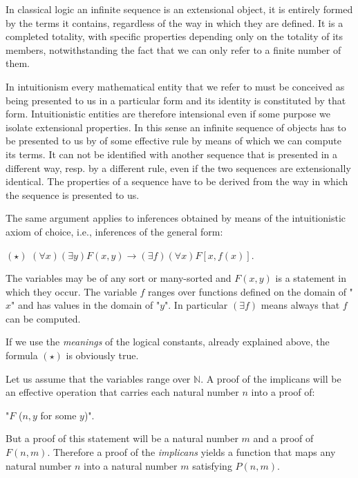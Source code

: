 \documentclass[12pt]{article}
\begin{document}
In classical logic an infinite sequence is an extensional object, it is entirely formed by the terms it contains, regardless of the way in which they are defined. It is a completed totality, with specific properties depending only on the totality of its members, notwithstanding the fact that we can only refer to a finite number of them. 

In intuitionism every mathematical entity that we refer to must be conceived as being presented to us in a particular form and its identity is constituted by that form. Intuitionistic entities are therefore intensional even if  some purpose we isolate extensional properties. In this sense an infinite sequence of objects has to be presented to us  by  of  some effective rule by means of which we can compute its terms. It can not be identified with another sequence that is presented in a different way, resp. by a different rule, even if the two sequences are extensionally identical. The properties of a sequence have to be derived from the way in which the sequence is presented to us.
 
The same argument applies to inferences obtained by means of the intuitionistic axiom of choice, i.e., inferences of the general form:
                 
\begin{center}
$(\star)$ \qquad \qquad $(\forall x) (\exists y) F (x, y) \rightarrow (\exists f) (\forall x) F [x, f (x)].$
\end{center}

The variables may be of any sort or many-sorted and $F (x, y)$ is a statement in which they occur. The variable $f$  ranges over functions defined on the domain of "$x$" and has values in the domain of "$y$". In particular $(\exists f)$ means always that $f$ can be computed.

If we use the \emph{meanings} of the logical constants, already explained above, the formula $(\star)$ is obviously true. 

Let us assume that the variables range over $\mathbb{N}$. A proof of the implicans will be an effective operation that carries each natural number $n$ into a proof of:

\begin{center}
"$F$ ($n, y$ for some $y$)".
\end{center}
 
But a proof of this statement will be a natural number $m$ and a proof of $F (n, m)$. Therefore a proof of the \emph{implicans} yields a function that maps any natural number $n$ into a natural number $m$ satisfying $P (n, m)$.
 
\end{document}
